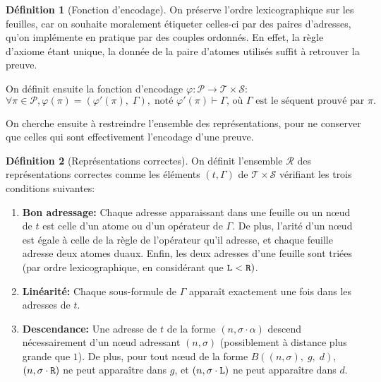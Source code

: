 \documentclass[11pt,a4paper]{article}
\theoremstyle{plain}
\theoremstyle{definition}
\newtheorem{definition}{Définition}
\theoremstyle{remark}
\newcommand*{\someproof}{\pi}
\newcommand*{\sequent}{\Gamma}
\newcommand*{\Left}{\textnormal{\texttt{L}}}
\newcommand*{\Right}{\textnormal{\texttt{R}}}
\newcommand*{\proofs}{\ensuremath{\mathcal{P}}}
\newcommand*{\sequents}{\ensuremath{\mathcal{S}}}
\newcommand*{\trees}{\ensuremath{\mathcal{T}}}
\newcommand*{\representationslarge}{\ensuremath{\trees \times \sequents}}
\newcommand*{\representations}{\ensuremath{\mathcal{R}}}
\newcommand*{\encode}{\ensuremath{\varphi}}
\begin{document}
\begin{definition}[Fonction d'encodage]
    On préserve l'ordre lexicographique sur les feuilles, car on souhaite moralement étiqueter celles-ci par des paires d'adresses, qu'on implémente en pratique par des couples ordonnés. En effet, la règle d'axiome étant unique, la donnée de la paire d'atomes utilisés suffit à retrouver la preuve.

    On définit ensuite la fonction d'encodage $\encode : \proofs \rightarrow \representationslarge$:
    \begin{equation*}
    \forall \someproof \in \proofs, \encode \left( \someproof \right) = \left( \encode' \left( \someproof \right), \; \sequent \right), \; \text{noté $\encode' \left( \someproof \right) \vdash \sequent$, où $\sequent$ est le séquent prouvé par $\someproof$.}
    \end{equation*}
\end{definition}

On cherche ensuite à restreindre l'ensemble des représentations, pour ne conserver que celles qui sont effectivement l'encodage d'une preuve.

\begin{definition}[Représentations correctes]
    \label{def_rep}
    On définit l'ensemble \representations{} des représentations correctes comme les éléments $(t, \sequent)$ de $\representationslarge$ vérifiant les trois conditions suivantes:
    
    \begin{enumerate}
    \item\label{cadd} \textbf{Bon adressage:} Chaque adresse apparaissant dans une feuille ou un n\oe ud de $t$ est celle d'un atome ou d'un opérateur de $\sequent$. De plus, l'arité d'un n\oe ud est égale à celle de la règle de l'opérateur qu'il adresse, et chaque feuille adresse deux atomes duaux. Enfin, les deux adresses d'une feuille sont triées (par ordre lexicographique, en considérant que $\Left < \Right)$.
    \item\label{clin} \textbf{Linéarité:} Chaque sous-formule de $\sequent$ apparaît exactement une fois dans les adresses de $t$.
    \item\label{cdes} \textbf{Descendance:} Une adresse de $t$ de la forme $(n, \sigma \cdot \alpha)$ descend nécessairement d'un n\oe ud adressant $(n, \sigma)$ (possiblement à distance plus grande que $1$). De plus, pour tout n\oe ud de la forme $B((n, \sigma), \; g, \; d)$, $(n, \sigma \cdot \Right)$ ne peut apparaître dans $g$, et $(n, \sigma \cdot \Left)$ ne peut apparaître dans $d$.
    \end{enumerate}
\end{definition}
\end{document}
